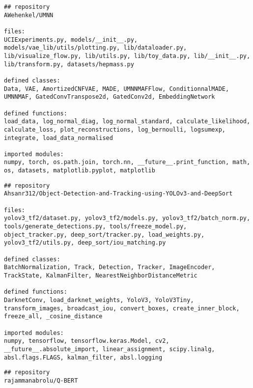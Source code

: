 \begin{samepage}
\begin{lstlisting}[caption=AWehenkel/UMNN - density estimation, variational inference]
## repository
AWehenkel/UMNN

files:
UCIExperiments.py, models/__init__.py, models/vae_lib/utils/plotting.py, lib/dataloader.py, lib/visualize_flow.py, lib/utils.py, lib/toy_data.py, lib/__init__.py, lib/transform.py, datasets/hepmass.py

defined classes:
Data, VAE, AmortizedCNFVAE, MADE, UMNNMAFFlow, ConditionnalMADE, UMNNMAF, GatedConvTranspose2d, GatedConv2d, EmbeddingNetwork

defined functions:
load_data, log_normal_diag, log_normal_standard, calculate_likelihood, calculate_loss, plot_reconstructions, log_bernoulli, logsumexp, integrate, load_data_normalised

imported modules:
numpy, torch, os.path.join, torch.nn, __future__.print_function, math, os, datasets, matplotlib.pyplot, matplotlib
\end{lstlisting}

\begin{samepage}
\begin{lstlisting}[caption=Ahsanr312/Object-Detection-and-Tracking-using-YOLOv3-and-DeepSort]
## repository
Ahsanr312/Object-Detection-and-Tracking-using-YOLOv3-and-DeepSort

files:
yolov3_tf2/dataset.py, yolov3_tf2/models.py, yolov3_tf2/batch_norm.py, tools/generate_detections.py, tools/freeze_model.py, object_tracker.py, deep_sort/tracker.py, load_weights.py, yolov3_tf2/utils.py, deep_sort/iou_matching.py

defined classes:
BatchNormalization, Track, Detection, Tracker, ImageEncoder, TrackState, KalmanFilter, NearestNeighborDistanceMetric

defined functions:
DarknetConv, load_darknet_weights, YoloV3, YoloV3Tiny, transform_images, broadcast_iou, convert_boxes, create_inner_block, freeze_all, _cosine_distance

imported modules:
numpy, tensorflow, tensorflow.keras.Model, cv2, __future__.absolute_import, linear_assignment, scipy.linalg, absl.flags.FLAGS, kalman_filter, absl.logging

\end{lstlisting}

\end{samepage}

\begin{samepage}
\begin{lstlisting}[caption=rajammanabrolu/Q-BERT - textual game playing]
## repository
rajammanabrolu/Q-BERT


\end{lstlisting}
\end{samepage}
\end{samepage}

